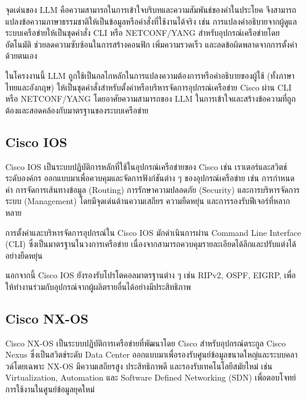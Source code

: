 \hspace*{1.3em} %
จุดเด่นของ LLM คือความสามารถในการเข้าใจบริบทและความสัมพันธ์ของคำในประโยค จึงสามารถแปลงข้อความภาษาธรรมชาติให้เป็นข้อมูลหรือคำสั่งที่ใช้งานได้จริง เช่น การแปลงคำอธิบายจากผู้ดูแลระบบเครือข่ายให้เป็นชุดคำสั่ง CLI หรือ NETCONF/YANG สำหรับอุปกรณ์เครือข่ายโดยอัตโนมัติ ช่วยลดความซับซ้อนในการสร้างคอนฟิก เพิ่มความรวดเร็ว และลดข้อผิดพลาดจากการตั้งค่าด้วยตนเอง

\hspace*{1.3em} %
ในโครงงานนี้ LLM ถูกใช้เป็นกลไกหลักในการแปลงความต้องการหรือคำอธิบายของผู้ใช้ (ทั้งภาษาไทยและอังกฤษ) ให้เป็นชุดคำสั่งสำหรับตั้งค่าหรือบริหารจัดการอุปกรณ์เครือข่าย Cisco ผ่าน CLI หรือ NETCONF/YANG โดยอาศัยความสามารถของ LLM ในการเข้าใจและสร้างข้อความที่ถูกต้องและสอดคล้องกับมาตรฐานของระบบเครือข่าย \parencite{llm}

\subsection{Cisco IOS}

\hspace*{1.3em} %
Cisco IOS เป็นระบบปฏิบัติการหลักที่ใช้ในอุปกรณ์เครือข่ายของ Cisco เช่น เราเตอร์และสวิตช์ระดับองค์กร ออกแบบมาเพื่อควบคุมและจัดการฟังก์ชันต่าง ๆ ของอุปกรณ์เครือข่าย เช่น การกำหนดค่า การจัดการเส้นทางข้อมูล (Routing) การรักษาความปลอดภัย (Security) และการบริหารจัดการระบบ (Management) โดยมีจุดเด่นด้านความเสถียร ความยืดหยุ่น และการรองรับฟีเจอร์ที่หลากหลาย


\hspace*{1.3em} %

\hspace*{1.3em} %
การตั้งค่าและบริหารจัดการอุปกรณ์ใน Cisco IOS มักดำเนินการผ่าน Command Line Interface (CLI) ซึ่งเป็นมาตรฐานในวงการเครือข่าย เนื่องจากสามารถควบคุมรายละเอียดได้ลึกและปรับแต่งได้อย่างยืดหยุ่น

\hspace*{1.3em} %
นอกจากนี้ Cisco IOS ยังรองรับโปรโตคอลมาตรฐานต่าง ๆ เช่น RIPv2, OSPF, EIGRP, เพื่อให้ทำงานร่วมกับอุปกรณ์จากผู้ผลิตรายอื่นได้อย่างมีประสิทธิภาพ \parencite{ios}

\subsection{Cisco NX-OS}

\hspace*{1.3em} %
Cisco NX-OS เป็นระบบปฏิบัติการเครือข่ายที่พัฒนาโดย Cisco สำหรับอุปกรณ์ตระกูล Cisco Nexus ซึ่งเป็นสวิตช์ระดับ Data Center ออกแบบมาเพื่อรองรับศูนย์ข้อมูลขนาดใหญ่และระบบคลาวด์โดยเฉพาะ NX-OS มีความเสถียรสูง ประสิทธิภาพดี และรองรับเทคโนโลยีสมัยใหม่ เช่น Virtualization, Automation และ Software Defined Networking (SDN) เพื่อตอบโจทย์การใช้งานในศูนย์ข้อมูลยุคใหม่

